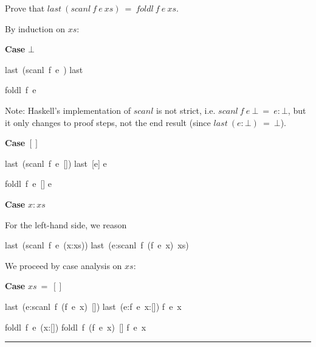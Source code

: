 \documentclass[twoside]{article}
\newenvironment{proof}{{\bf Proof:}}{\hfill\rule{2mm}{2mm}}
\begin{document}
Prove that $last~(scanl~f~e~xs)~=~foldl~f~e~xs$.

\begin{proof}
By induction on $xs$:

  \textbf{Case} $\bot$
\begin{minipage}[t]{.4\textwidth}
\begin{calculation}
  last~(scanl~f~e~\bot)
  last~\bot
{}
  \bot
\end{calculation}
\end{minipage}%
\begin{minipage}[t]{.4\textwidth}
\begin{calculation}
  foldl~f~e~\bot
{}
  \bot
\end{calculation}
\end{minipage}

Note: Haskell's implementation of $scanl$ is not strict, i.e.
$scanl~f~e~\bot~=~e:\bot$, but it only changes to proof steps, not the end
result (since $last~(e:\bot)~=~\bot$).

\textbf{Case} $[]$
\begin{minipage}[t]{.4\textwidth}
\begin{calculation}
  last~(scanl~f~e~[])
  last~[e]
  e
\end{calculation}
\end{minipage}%
\begin{minipage}[t]{.4\textwidth}
\begin{calculation}
  foldl~f~e~[]
  e
\end{calculation}
\end{minipage}

\textbf{Case} $x:xs$

For the left-hand side, we reason
\begin{calculation}
  last~(scanl~f~e~(x:xs))
  last~(e:scanl~f~(f~e~x)~xs)
\end{calculation}
We proceed by case analysis on $xs$:

\textbf{Case} $xs~=~[]$

\begin{minipage}[t]{.4\textwidth}
\begin{calculation}
  last~(e:scanl~f~(f~e~x)~[])
  last~(e:f~e~x:[])
  f~e~x
\end{calculation}
\end{minipage}%
\begin{minipage}[t]{.4\textwidth}
\begin{calculation}
  foldl~f~e~(x:[])
  foldl~f~(f~e~x)~[]
  f~e~x
\end{calculation}
\end{minipage}


\end{proof}
\end{document}
